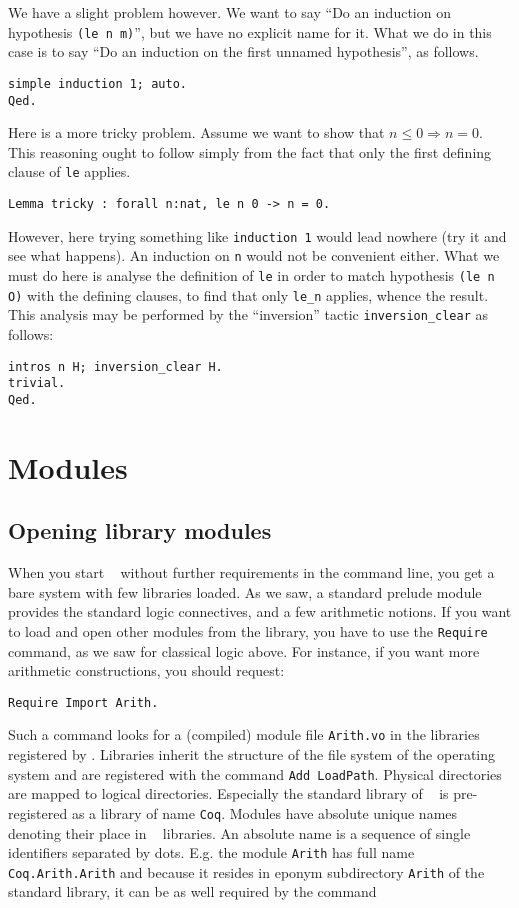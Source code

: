 \documentclass{book}
\begin{document}
We have a slight problem however. We want to say ``Do an induction on
hypothesis \verb:(le n m):'', but we have no explicit name for it. What we
do in this case is to say ``Do an induction on the first unnamed hypothesis'',
as follows.
\begin{lstlisting}
simple induction 1; auto.
Qed.
\end{lstlisting}

Here is a more tricky problem. Assume we want to show that
$n\le 0 \Rightarrow n=0$. This reasoning ought to follow simply from the
fact that only the first defining clause of \verb:le: applies.
\begin{lstlisting} 
Lemma tricky : forall n:nat, le n 0 -> n = 0.
\end{lstlisting}

However, here trying something like \verb:induction 1: would lead
nowhere (try it and see what happens). 
An induction on \verb:n: would not be convenient either.
What we must do here is analyse the definition of \verb"le" in order
to match hypothesis \verb:(le n O): with the defining clauses, to find
that only \verb:le_n: applies, whence the result. 
This analysis may be performed by the ``inversion'' tactic
\verb:inversion_clear: as follows:
\begin{lstlisting} 
intros n H; inversion_clear H.
trivial.
Qed.
\end{lstlisting}

\chapter{Modules}

\section{Opening library modules}

When you start \Coq~ without further requirements in the command line,
you get a bare system with few libraries loaded.  As we saw, a standard
prelude module provides the standard logic connectives, and a few
arithmetic notions. If you want to load and open other modules from
the library, you have to use the \verb"Require" command, as we saw for
classical logic above. For instance, if you want more arithmetic
constructions, you should request:
\begin{lstlisting}
Require Import Arith.
\end{lstlisting}

Such a command looks for a (compiled) module file \verb:Arith.vo: in
the libraries registered by \Coq. Libraries inherit the structure of
the file system of the operating system and are registered with the
command \verb:Add LoadPath:. Physical directories are mapped to
logical directories. Especially the standard library of \Coq~ is
pre-registered as a library of name \verb=Coq=.  Modules have absolute
unique names denoting their place in \Coq~ libraries.  An absolute
name is a sequence of single identifiers separated by dots.  E.g. the
module \verb=Arith= has full name \verb=Coq.Arith.Arith= and because
it resides in eponym subdirectory \verb=Arith= of the standard
library, it can be as well required by the command
\end{document}
